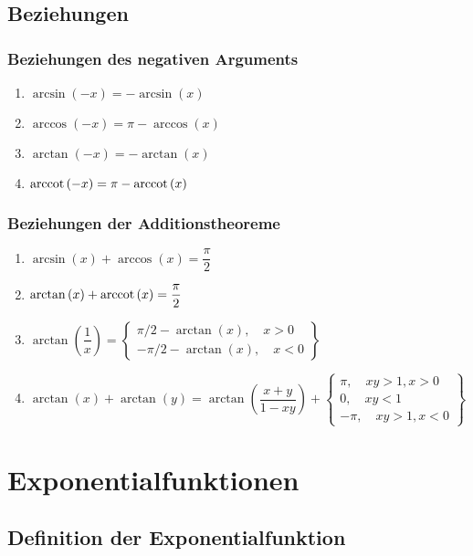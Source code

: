 \subsection{Beziehungen}
\subsubsection{Beziehungen des negativen Arguments}
\begin{enumerate}[$(a)$]
\item $\arcsin\left(-x\right)=-\arcsin\left(x\right)$
\item $\arccos\left(-x\right)=\pi-\arccos\left(x\right)$
\item $\arctan\left(-x\right)=-\arctan\left(x\right)$
\item $\operatorname{arccot}\left(-x\right)=\pi-\operatorname{arccot}\left(x\right)$
\end{enumerate}
\subsubsection{Beziehungen der Additionstheoreme}
\begin{enumerate}[$(a)$]
\item $\arcsin\left(x\right)+\arccos\left(x\right)=\dfrac{\pi}{2}$
\item $\arctan\left(x\right)+\operatorname{arccot}\left(x\right)=\dfrac{\pi}{2}$
\item $\arctan\left(\dfrac{1}{x}\right)=\left\{\begin{array}{l}\pi/2-\arctan\left(x\right),\quad x>0\\-\pi/2-\arctan\left(x\right),\quad x<0\end{array}\right\}$
\item $\arctan\left(x\right)+\arctan\left(y\right)=\arctan\left(\dfrac{x+y}{1-xy}\right)+\left\{\begin{array}{l}\pi,\quad xy>1,x>0\\0,\quad xy<1\\-\pi,\quad xy>1, x<0\end{array}\right\}$
\end{enumerate}
\section{Exponentialfunktionen}
\subsection{Definition der Exponentialfunktion}
